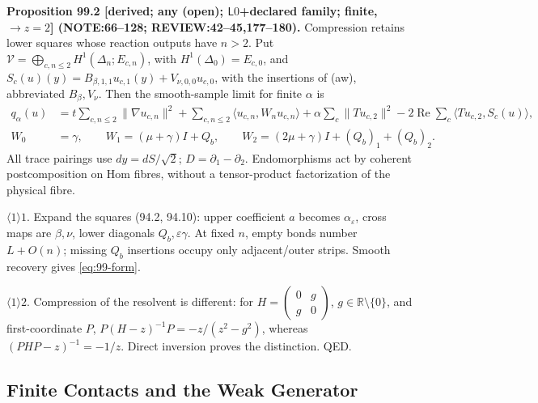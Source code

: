 \textbf{Proposition 99.2 [derived; any (open); \(\mathsf L0\)+declared family; finite, \(\to z=2\)]
(NOTE:66--128; REVIEW:42--45,177--180).}
Compression retains lower squares whose reaction outputs have \(n>2\). Put
\(\mathcal V=\bigoplus_{c,n\le2}H^1(\Delta_n;E_{c,n})\), with \(H^1(\Delta_0)=E_{c,0}\), and
\(S_c(u)(y)=B_{\beta,1,1}u_{c,1}(y)+V_{\nu,0,0}u_{c,0}\), with the insertions of (aw), abbreviated \(B_\beta,V_\nu\).
Then the smooth-sample limit for finite \(\alpha\) is
\begin{equation}\label{eq:99-form}
\begin{split}
q_\alpha(u)&=t\sum_{c,n\le2}\|\nabla u_{c,n}\|^2+\sum_{c,n\le2}\langle u_{c,n},W_nu_{c,n}\rangle
 +\alpha\sum_c\|Tu_{c,2}\|^2-2\operatorname{Re}\sum_c\langle Tu_{c,2},S_c(u)\rangle,\\
W_0&=\gamma,\qquad W_1=(\mu+\gamma)I+Q_b,\qquad W_2=(2\mu+\gamma)I+(Q_b)_1+(Q_b)_2 .
\end{split}
\end{equation}
All trace pairings use \(dy=dS/\sqrt2\); \(D=\partial_1-\partial_2\). Endomorphisms act by coherent
postcomposition on Hom fibres, without a tensor-product factorization of the physical fibre.
\par\(\langle1\rangle1\). Expand the squares (94.2, 94.10): upper coefficient \(a\) becomes \(\alpha_\varepsilon\), cross maps
are \(\beta,\nu\), lower diagonals \(Q_b,\varepsilon\gamma\). At fixed \(n\), empty bonds number \(L+O(n)\);
missing \(Q_b\) insertions occupy only adjacent/outer strips. Smooth recovery gives \eqref{eq:99-form}.
\par\(\langle1\rangle2\). Compression of the resolvent is different: for \(H=\left(\begin{smallmatrix}0&g\\g&0\end{smallmatrix}\right)\),
\(g\in\mathbb R\setminus\{0\}\), and first-coordinate \(P\), \(P(H-z)^{-1}P=-z/(z^2-g^2)\), whereas
\((PHP-z)^{-1}=-1/z\). Direct inversion proves the distinction. QED.

\subsection{Finite Contacts and the Weak Generator}

